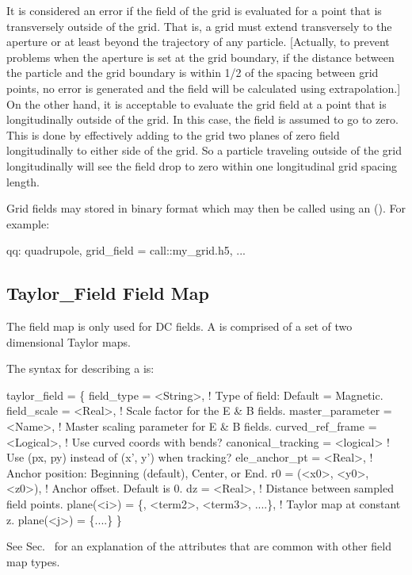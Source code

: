 It is considered an error if the field of the grid is evaluated for a point that is transversely
outside of the grid. That is, a grid must extend transversely to the aperture or at least beyond the
trajectory of any particle. [Actually, to prevent problems when the aperture is set at the grid
boundary, if the distance between the particle and the grid boundary is within 1/2 of the spacing
between grid points, no error is generated and the field will be calculated using extrapolation.] On
the other hand, it is acceptable to evaluate the grid field at a point that is longitudinally
outside of the grid. In this case, the field is assumed to go to zero. This is done by effectively
adding to the grid two planes of zero field longitudinally to either side of the grid. So a particle
traveling outside of the grid longitudinally will see the field drop to zero within one longitudinal
grid spacing length.

Grid fields may stored in  binary format which may then be called using an 
(). For example:
\begin{example}
  qq: quadrupole, grid_field = call::my_grid.h5, ...
\end{example}

\subsection{Taylor_Field Field Map}
\label{s:taylor.field}

The  field map is only used for DC fields. A  is comprised
of a set of two dimensional Taylor maps.  

The syntax for describing a  is:
\begin{example}
  taylor_field = \{
    field_type       = <String>,    ! Type of field: Default = Magnetic.
    field_scale      = <Real>,      ! Scale factor for the E & B fields.
    master_parameter = <Name>,      ! Master scaling parameter for E & B fields.
    curved_ref_frame   = <Logical>, ! Use curved coords with bends?
    canonical_tracking = <logical>  ! Use (px, py) instead of (x', y') when tracking?
    ele_anchor_pt    = <Real>,      ! Anchor position: Beginning (default), Center, or End.
    r0               = (<x0>, <y0>, <z0>), ! Anchor offset. Default is 0.
    dz               = <Real>,             ! Distance between sampled field points.
    plane(<i>) = \{<term1>, <term2>, <term3>, ....\}, ! Taylor map at constant z.
    plane(<j>) = \{....\}  \}
\end{example}
See Sec.~ for an explanation of the attributes that are common with
other field map types.

